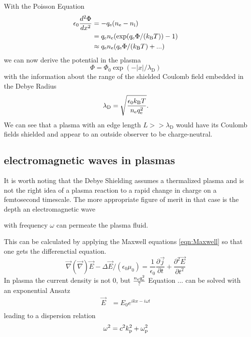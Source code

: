 With the Poisson Equation 
\begin{align}
\label{eqn:Poisson_plasma}
\epsilon_0 \frac{d^2\Phi}{dx^2}&=-q_\mathrm{e}(n_\mathrm{e}-n_\mathrm{i})\\
&=q_\mathrm{e} n_\mathrm{e} (\exp(q_\mathrm{e}\Phi/(k_\mathrm{B}T))-1)\\
&\approx q_\mathrm{e}n_\mathrm{e}(q_\mathrm{e}\Phi/(k_\mathrm{B}T)+...)
\end{align}
we can now derive the potential in the plasma
\begin{equation}
\Phi = \Phi_0\exp(-|x|/\lambda_\mathrm{D})
\end{equation}
with the information about the range of the shielded Coulomb field embedded in the Debye Radius
\begin{equation}
\lambda_\mathrm{D}=\sqrt{\frac{\epsilon_0 k_\mathrm{B}T}{n_\mathrm{e}q_\mathrm{e}^2}}.
\end{equation}
We can see that a plasma with an edge length $L>>\lambda_\mathrm{D}$ would have its Coulomb fields shielded and appear to an outside observer to be charge-neutral. 





\subsection{electromagnetic waves in plasmas}
It is worth noting that the Debye Shielding assumes a thermalized plasma and is not the right idea of a plasma reaction to a rapid change in charge on a femtosecond timescale. 
The more appropriate figure of merit in that case is the depth an electromagnetic wave 

with frequency $\omega$ can permeate the plasma fluid.

This can be calculated by applying the Maxwell equations \ref{eqn:Maxwell} so that one gets the differenctial equation.
\begin{equation}
\label{eqn:Laser_prop_DGL}
\vec{\nabla}(\vec{\nabla})\vec{E}-\Delta \vec{E}/(\epsilon_0 \mu_0)=\frac{1}{\epsilon_0}\frac{\partial \vec{j}}{\partial t}+\frac{\partial^2 \vec{E}}{\partial t^2}
\end{equation}
In plasma the current density is not 0, but 
$\frac{n_\mathrm{e} q_\mathrm{e}^2}{?}$
Equation ... can be solved with an exponential Ansatz
\begin{align}
\vec{E}&=E_0 e^{ikx-i\omega t}\\
\end{align}
leading to a dispersion relation
\begin{equation}
\omega^2 = c^2 k_\mathrm{p}^2+\omega_\mathrm{p}^2
\end{equation}

